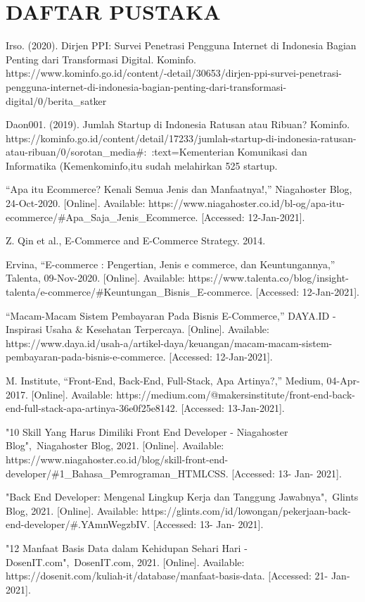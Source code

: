 \chapter*{DAFTAR PUSTAKA}
\begin{enumerate}[label={[\arabic*]}]
	\item Irso. (2020). Dirjen PPI: Survei Penetrasi Pengguna Internet di Indonesia Bagian Penting dari Transformasi Digital. Kominfo. https://www.kominfo.go.id/content/-detail/30653/dirjen-ppi-survei-penetrasi-pengguna-internet-di-indonesia-bagian-penting-dari-transformasi-digital/0/berita\_satker
	\item Daon001. (2019). Jumlah Startup di Indonesia Ratusan atau Ribuan? Kominfo. https://kominfo.go.id/content/detail/17233/jumlah-startup-di-indonesia-ratusan-atau-ribuan/0/sorotan\_media\#:~:text=Kementerian Komunikasi dan Informatika (Kemenkominfo,itu sudah melahirkan 525 startup.
	\item “Apa itu Ecommerce? Kenali Semua Jenis dan Manfaatnya!,” Niagahoster Blog, 24-Oct-2020. [Online]. Available: https://www.niagahoster.co.id/bl-og/apa-itu-ecommerce/\#Apa\_Saja\_Jenis\_Ecommerce. [Accessed: 12-Jan-2021]. 
	\item Z. Qin et al., E-Commerce and E-Commerce Strategy. 2014.
	\item Ervina, “E-commerce : Pengertian, Jenis e commerce, dan Keuntungannya,” Talenta, 09-Nov-2020. [Online]. Available: https://www.talenta.co/blog/insight-talenta/e-commerce/\#Keuntungan\_Bisnis\_E-commerce. [Accessed: 12-Jan-2021]. 
	\item “Macam-Macam Sistem Pembayaran Pada Bisnis E-Commerce,” DAYA.ID - Inspirasi Usaha \& Kesehatan Terpercaya. [Online]. Available: https://www.daya.id/usah-a/artikel-daya/keuangan/macam-macam-sistem-pembayaran-pada-bisnis-e-commerce. [Accessed: 12-Jan-2021]. 
	\item M. Institute, “Front-End, Back-End, Full-Stack, Apa Artinya?,” Medium, 04-Apr-2017. [Online]. Available: https://medium.com/@makersinstitute/front-end-back-end-full-stack-apa-artinya-36e0f25e8142. [Accessed: 13-Jan-2021]. 
	\item "10 Skill Yang Harus Dimiliki Front End Developer - Niagahoster Blog", Niagahoster Blog, 2021. [Online]. Available: https://www.niagahoster.co.id/blog/skill-front-end-developer/\#1\_Bahasa\_Pemrograman\_HTMLCSS. [Accessed: 13- Jan- 2021].
	\item "Back End Developer: Mengenal Lingkup Kerja dan Tanggung Jawabnya", Glints Blog, 2021. [Online]. Available: https://glints.com/id/lowongan/pekerjaan-back-end-developer/\#.YAmnWegzbIV. [Accessed: 13- Jan- 2021].
	\item "12 Manfaat Basis Data dalam Kehidupan Sehari Hari - DosenIT.com", DosenIT.com, 2021. [Online]. Available: https://dosenit.com/kuliah-it/database/manfaat-basis-data. [Accessed: 21- Jan- 2021].
\end{enumerate}